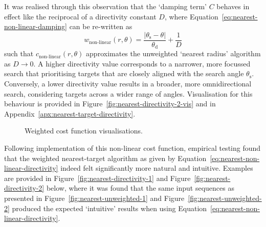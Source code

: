 \documentclass[12pt,british,UKenglish]{article}
\begin{document}
It was realised through this observation that the `damping term' $C$ behaves in effect like the reciprocal of a directivity constant $D$, where Equation~\eqref{eq:nearest-non-linear-damping} can be re-written as
\begin{equation}
    w_\text{non-linear}(r, \theta) = \frac{\left\lvert \theta_\text{s} - \theta \right\rvert}{\theta_\text{d}} + \frac{1}{D}
    \label{eq:nearest-non-linear-directivity}
\end{equation}
such that $c_\text{non-linear}(r, \theta)$ approximates the unweighted `nearest radius' algorithm as $D \to 0$.
A higher directivity value corresponds to a narrower, more focussed search that prioritising targets that are closely aligned with the search angle $\theta_\text{s}$.
Conversely, a lower directivity value results in a broader, more omnidirectional search, considering targets across a wider range of angles.
Visualisation for this behaviour is provided in Figure~\ref{fig:nearest-directivity-2-vis} and in Appendix~\ref{apx:nearest-target-directivity}.
\begin{figure}[hbtp]
    \quad
    \centering
    \caption{Weighted cost function visualisations.}
\end{figure}

Following implementation of this non-linear cost function, empirical testing found that the weighted nearest-target algorithm as given by Equation~\eqref{eq:nearest-non-linear-directivity} indeed felt significantly more natural and intuitive.
Examples are provided in Figure~\ref{fig:nearest-directivity-1} and Figure~\ref{fig:nearest-directivity-2} below, where it was found that the same input sequences as presented in Figure~\ref{fig:nearest-unweighted-1} and Figure~\ref{fig:nearest-unweighted-2} produced the expected `intuitive' results when using Equation~\eqref{eq:nearest-non-linear-directivity}.
\end{document}
